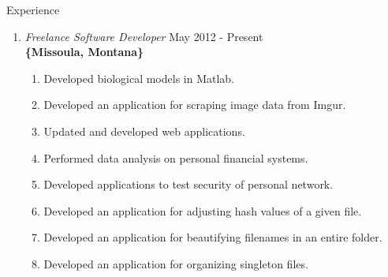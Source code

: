 \documentclass[oneside]{article}%
\begin{document}

\renewcommand{\footrulewidth}{1pt}


\noindent
\huge{Experience}
\normalsize
\begin{enumerate}[]
	\item \textit{Freelance Software Developer} \hfill May 2012 - Present\\
		\textbf{\{Missoula, Montana\}}
		\begin{enumerate}[*]
			\item Developed biological models in Matlab.
			\item Developed an application for scraping image data from Imgur.
			\item Updated and developed web applications.
			\item Performed data analysis on personal financial systems.
			\item Developed applications to test security of personal network.
			\item Developed an application for adjusting hash values of a given file.
			\item Developed an application for beautifying filenames in an entire folder.
			\item Developed an application for organizing singleton files.
		\end{enumerate}


\end{enumerate}
\end{document}
